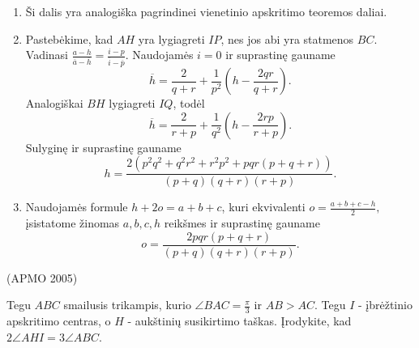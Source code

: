 \documentclass[11pt,a4paper,twoside]{book}
\begin{document}
\begin{sprendimas}
\begin{enumerate}
\item Ši dalis yra analogiška pagrindinei vienetinio apskritimo teoremos daliai.
\item Pastebėkime, kad $AH$ yra lygiagreti $IP$, nes jos abi yra statmenos $BC$. Vadinasi $\frac{a-h}{\overline a-\overline h}=\frac{i-p}{\overline i-\overline p}.$ Naudojamės $i=0$ ir suprastinę gauname $$\overline {h}= \frac{2}{q+r} + \frac{1}{p^2}(h-\frac{2qr}{q+r}).$$ Analogiškai $BH$ lygiagreti $IQ$, todėl $$\overline {h}= \frac{2}{r+p} + \frac{1}{q^2}(h-\frac{2rp}{r+p}).$$
Sulyginę ir suprastinę gauname $$h=\frac{2(p^2q^2 + q^2r^2 + r^2p^2 + pqr(p + q+ r))}{(p+q)(q+r)(r+p)}.$$
\item Naudojamės formule $h+2o=a+b+c$, kuri ekvivalenti $o=\frac{a+b+c-h}{2},$ įsistatome žinomas $a, b, c, h$ reikšmes ir suprastinę gauname
$$o=\frac{2pqr(p+q+r)}{(p+q)(q+r)(r+p)}.$$
\end{enumerate}
\end{sprendimas}






\begin{pavnr}
(APMO 2005)

Tegu $ABC$ smailusis trikampis, kurio $\angle BAC = \frac{\pi}{3}$ ir $AB>AC$. Tegu $I$ - įbrėžtinio apskritimo centras, o $H$ - aukštinių susikirtimo taškas. Įrodykite, kad $2\angle AHI=3\angle ABC$.
\end{pavnr}
\end{document}
